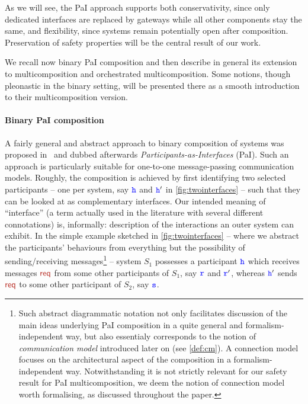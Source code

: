 As we will see, the PaI approach supports both conservativity, since only dedicated interfaces are replaced by gateways while all other components stay  the same,   %
and flexibility,  since systems remain potentially open after composition.
Preservation of safety properties will be the central result of our work.




We recall now binary PaI composition and then describe in general its extension to multicomposition
and orchestrated multicomposition. Some notions, though pleonastic in the binary setting,
will be presented there as a smooth introduction to their multicomposition version.
 

\noindent
\paragraph{ Binary PaI composition}
A fairly general and abstract approach to binary composition of systems 
was proposed in~\cite{BdLH19} and dubbed afterwards {\em Participants-as-Interfaces} (PaI).
 Such an approach is particularly suitable for one-to-one message-passing communication models.
Roughly, the composition is achieved by first identifying two selected participants  -- one per system,
say ${\mathtt{\color{blue}{ {h}}}}$ and ${\mathtt{\color{blue}{ {h}}}}'$ in \cref{fig:twointerfaces} -- such that they can be looked at as
complementary interfaces. Our intended meaning of ``interface'' (a term actually used in the literature with  several different connotations) is, informally: description of the interactions an outer system can
exhibit.  %
In the simple example sketched in \cref{fig:twointerfaces}
--  where we abstract the participants' behaviours from everything but the possibility of 
 sending/receiving messages\footnote{Such abstract diagrammatic notation not only facilitates  
 discussion of the main ideas underlying PaI composition in a quite general  and formalism-independent way, 
 but also essentialy corresponds to the notion of {\em communication model} introduced later on (see \cref{def:cm}).
  A connection model focuses on the architectural aspect of the composition in a formalism-independent way. 
 Notwithstanding it is not strictly relevant for our safety result for 
 PaI multicomposition,  we deem the notion of connection model worth formalising, as discussed throughout the paper. 
 }  -- system $S_1$ possesses a participant 
 ${\mathtt{\color{blue}{ {h}}}}$ which receives messages $\msg[req]$ from some other participants of $S_1$, say ${\mathtt{\color{blue}{ {r}}}}$ and ${\mathtt{\color{blue}{ {r}}}}'$, whereas ${\mathtt{\color{blue}{ {h}}}}'$ sends $\msg[req]$ to some other participant of $S_2$, say ${\mathtt{\color{blue}{ {s}}}}$. 
